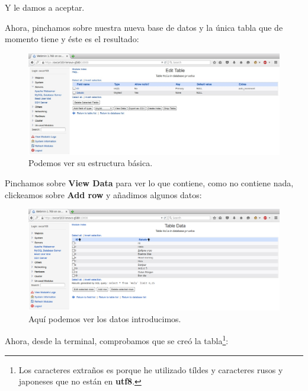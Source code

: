\documentclass[paper=a4, fontsize=11pt]{scrartcl} %
\numberwithin{equation}{section} %
\numberwithin{figure}{section} %
\numberwithin{table}{section} %
\begin{document}
\begin{enumerate}
		Y le damos a aceptar.
		
		Ahora, pinchamos sobre nuestra nueva base de datos y la única tabla que de momento tiene y
		éste es el resultado:
		
		\begin{figure}[H]
			\centering
			\includegraphics[width=15cm]{Ejercicio_19c.jpg}
			\caption{Podemos ver su estructura básica.}
			\label{fig:created}
		\end{figure}
		
		Pinchamos sobre \textbf{View Data} para ver lo que contiene, como no contiene nada, clickeamos
		sobre \textbf{Add row} y añadimos algunos datos:
		
		\begin{figure}[H]
			\centering
			\includegraphics[width=15cm]{Ejercicio_19d.jpg}
			\caption{Aquí podemos ver los datos introducimos.}
			\label{fig:data}
		\end{figure}
		
		Ahora, desde la terminal, comprobamos que se creó la tabla\footnote{Los caracteres extraños
		es porque he utilizado tíldes y caracteres rusos y japoneses que no están en \textbf{utf8}.}:
		

\end{enumerate}
\end{document}

